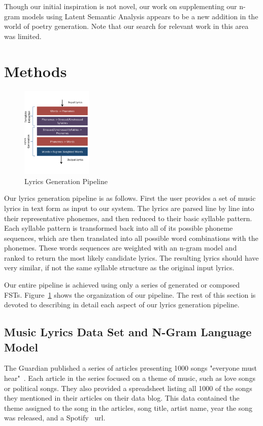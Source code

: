 \documentclass{vgtc}                          %
\begin{document}
Though our initial inspiration is not novel, our work on supplementing our n-gram
models using Latent Semantic Analysis appears to be a new addition
in the world of poetry generation. Note that our search for relevant work in this
area was limited.

\section{Methods}
\label{sec:methods}

\begin{figure}%
\centering
\includegraphics[width=0.3\textwidth]{images/pdf/pipeline.pdf}
\caption{Lyrics Generation Pipeline}
\label{fig:pipeline}
\end{figure}

Our lyrics generation pipeline is as follows. First the user provides
a set of music lyrics in text form as input to our system. The
lyrics are parsed line by line into their representative phonemes,
and then reduced to their basic syllable pattern.
Each syllable pattern is transformed back into all of its possible
phoneme sequences, which are then translated into all possible 
word combinations with the phonemes. These words sequences are weighted with
an n-gram model and ranked to return the most likely
candidate lyrics. The resulting lyrics should have very
similar, if not the same syllable structure as the original
input lyrics.

Our entire pipeline is achieved using only a series of
generated or composed FSTs. Figure~\ref{fig:pipeline}
shows the organization of our pipeline.
The rest of this section is devoted to describing
in detail each aspect of our lyrics generation pipeline.

\subsection{Music Lyrics Data Set and N-Gram Language Model}
The Guardian published a series of articles presenting 1000 songs "everyone must hear"~\cite{guardian}.
Each article in the series focused on a theme of music, such as love songs or political songs.
They also provided a spreadsheet listing all 1000 of the songs they mentioned in their articles
on their data blog\cite{guardian2}. This
data contained the theme assigned to the song in the articles,
song title, artist name, year the song was released, and a Spotify~\cite{spotify} url.
\end{document}
